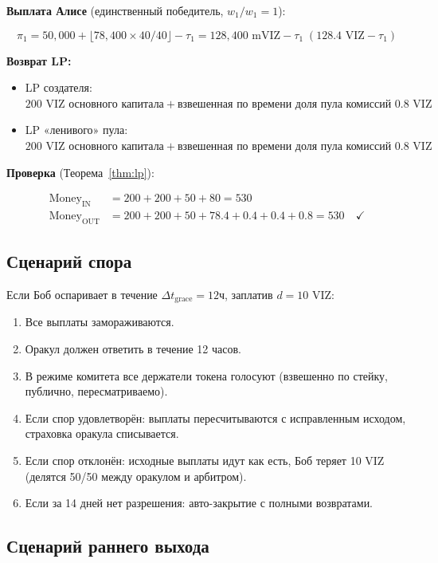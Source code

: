 \documentclass{ledger}
\theoremstyle{plain}
\theoremstyle{remark}
\begin{document}
\textbf{Выплата Алисе} (единственный победитель, $w_1 / w_1 = 1$):

\[
\pi_1 = 50{,}000 + \lfloor 78{,}400 \times 40/40 \rfloor - \tau_1 = 128{,}400
\text{ mVIZ} - \tau_1 \;(128.4 \text{ VIZ} - \tau_1)
\]

\textbf{Возврат LP:}

\begin{itemize}
  \item LP создателя: $200 \text{ VIZ основного капитала} + \text{взвешенная по времени доля пула комиссий }
  0.8 \text{ VIZ}$
  \item LP «ленивого» пула: $200 \text{ VIZ основного капитала} + \text{взвешенная по времени доля пула комиссий }
  0.8 \text{ VIZ}$
\end{itemize}

\textbf{Проверка} (Теорема~\ref{thm:lp}):

\begin{align*}
\text{Money}_{\text{IN}} &= 200 + 200 + 50 + 80 = 530 \\
\text{Money}_{\text{OUT}} &= 200 + 200 + 50 + 78.4 + 0.4 + 0.4 + 0.8 = 530 \quad
\checkmark
\end{align*}

\subsection{Сценарий спора}

Если Боб оспаривает в течение $\Delta t_{\text{grace}} = 12\text{ч}$, заплатив $d = 10$
VIZ:

\begin{enumerate}
  \item Все выплаты замораживаются.
  \item Оракул должен ответить в течение 12 часов.
  \item В режиме комитета все держатели токена голосуют (взвешенно по стейку,
  публично, пересматриваемо).
  \item Если спор удовлетворён: выплаты пересчитываются с исправленным исходом,
  страховка оракула списывается.
  \item Если спор отклонён: исходные выплаты идут как есть, Боб теряет 10 VIZ
  (делятся 50/50 между оракулом и арбитром).
  \item Если за 14 дней нет разрешения: авто-закрытие с полными возвратами.
\end{enumerate}

\subsection{Сценарий раннего выхода}\label{sec:exitexample}
\end{document}
